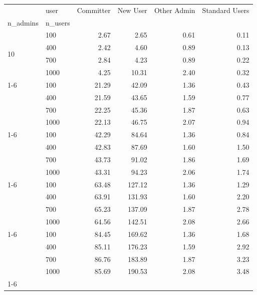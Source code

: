 \begin{tabular}{llrrrr}
\toprule
 & user & Committer & New User & Other Admin & Standard Users \\
n_admins & n_users &  &  &  &  \\
\midrule
\multirow[t]{4}{*}{10} & 100 & 2.67 & 2.65 & 0.61 & 0.11 \\
                        & 400 & 2.42 & 4.60 & 0.89 & 0.13 \\
                        & 700 & 2.84 & 4.23 & 0.89 & 0.22 \\
                        & 1000 & 4.25 & 10.31 & 2.40 & 0.32 \\
\cline{1-6}
\multirow[t]{4}{*}{50} & 100 & 21.29 & 42.09 & 1.36 & 0.43 \\
                        & 400 & 21.59 & 43.65 & 1.59 & 0.77 \\
                        & 700 & 22.25 & 45.36 & 1.87 & 0.63 \\
                        & 1000 & 22.13 & 46.75 & 2.07 & 0.94 \\
\cline{1-6}
\multirow[t]{4}{*}{100} & 100 & 42.29 & 84.64 & 1.36 & 0.84 \\
                        & 400 & 42.83 & 87.69 & 1.60 & 1.50 \\
                        & 700 & 43.73 & 91.02 & 1.86 & 1.69 \\
                        & 1000 & 43.31 & 94.23 & 2.06 & 1.74 \\
\cline{1-6}
\multirow[t]{4}{*}{150} & 100 & 63.48 & 127.12 & 1.36 & 1.29 \\
                        & 400 & 63.91 & 131.93 & 1.60 & 2.20 \\
                        & 700 & 65.23 & 137.09 & 1.87 & 2.78 \\
                        & 1000 & 64.56 & 142.51 & 2.08 & 2.66 \\
\cline{1-6}
\multirow[t]{4}{*}{200} & 100 & 84.45 & 169.62 & 1.36 & 1.68 \\
                        & 400 & 85.11 & 176.23 & 1.59 & 2.92 \\
                        & 700 & 86.76 & 183.89 & 1.87 & 3.23 \\
                        & 1000 & 85.69 & 190.53 & 2.08 & 3.48 \\
\cline{1-6}
\bottomrule
\end{tabular}
